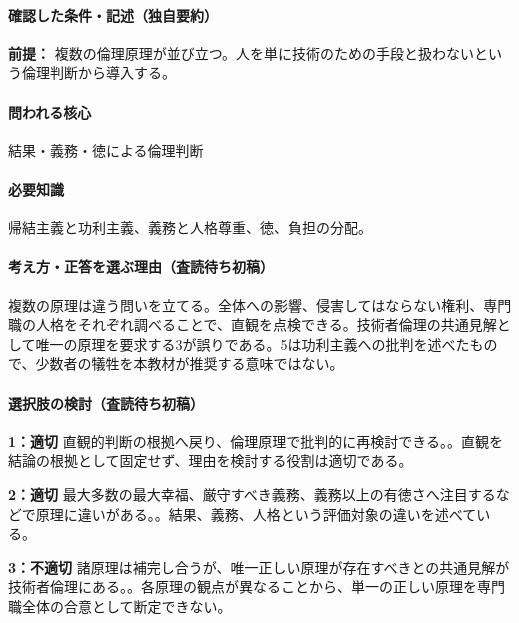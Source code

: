 \paragraph{確認した条件・記述（独自要約）}\mbox{}\par

\noindent\textbf{前提：} 複数の倫理原理が並び立つ。人を単に技術のための手段と扱わないという倫理判断から導入する。\par

\paragraph{問われる核心} 結果・義務・徳による倫理判断

\paragraph{必要知識} 帰結主義と功利主義、義務と人格尊重、徳、負担の分配。

\paragraph{考え方・正答を選ぶ理由（査読待ち初稿）} 複数の原理は違う問いを立てる。全体への影響、侵害してはならない権利、専門職の人格をそれぞれ調べることで、直観を点検できる。技術者倫理の共通見解として唯一の原理を要求する3が誤りである。5は功利主義への批判を述べたもので、少数者の犠牲を本教材が推奨する意味ではない。

\paragraph{選択肢の検討（査読待ち初稿）}\mbox{}\par

\noindent\textbf{1：適切} 直観的判断の根拠へ戻り、倫理原理で批判的に再検討できる。。直観を結論の根拠として固定せず、理由を検討する役割は適切である。\par

\noindent\textbf{2：適切} 最大多数の最大幸福、厳守すべき義務、義務以上の有徳さへ注目するなどで原理に違いがある。。結果、義務、人格という評価対象の違いを述べている。\par

\noindent\textbf{3：不適切} 諸原理は補完し合うが、唯一正しい原理が存在すべきとの共通見解が技術者倫理にある。。各原理の観点が異なることから、単一の正しい原理を専門職全体の合意として断定できない。\par

